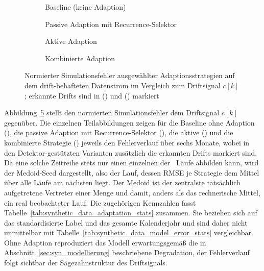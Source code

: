 %
\begin{figure}[tbp]
    \centering
    \begin{subfigure}[t]{\textwidth}
        \centering
        
        \caption{Baseline (keine Adaption)}
        \label{fig:synthetic_data_adaptation_baseline}
    \end{subfigure}

    \begin{subfigure}[t]{\textwidth}
        \centering
        
        \caption{Passive Adaption mit Recurrence-Selektor}
        \label{fig:synthetic_data_adaptation_blind_rec}
    \end{subfigure}

    \begin{subfigure}[t]{\textwidth}
        \centering
        
        \caption{Aktive Adaption}
        \label{fig:synthetic_data_adaptation_informed}
    \end{subfigure}

    \begin{subfigure}[t]{\textwidth}
        \centering
        
        \caption{Kombinierte Adaption}
        \label{fig:synthetic_data_adaptation_combined}
    \end{subfigure}
    \caption{Normierter Simulationsfehler ausgewählter Adaptionsstrategien auf dem drift-behafteten Datenstrom im Vergleich zum Driftsignal $c[k]$; erkannte Drifts sind in () und () markiert}
    \label{fig:synthetic_data_adaptation_comparison}
\end{figure}
%
Abbildung~\ref{fig:synthetic_data_adaptation_comparison} stellt den normierten Simulationsfehler dem Driftsignal $c[k]$ gegenüber. Die einzelnen Teilabbildungen zeigen für die Baseline ohne Adaption (), die passive Adaption mit Recurrence-Selektor (), die aktive () und die kombinierte Strategie () jeweils den Fehlerverlauf über sechs Monate, wobei in den Detektor-gestützten Varianten zusätzlich die erkannten Drifts markiert sind. Da eine solche Zeitreihe stets nur einen einzelnen der \adaptNSeeds\ Läufe abbilden kann, wird der Medoid-Seed dargestellt, also der Lauf, dessen \ac{RMSE} je Strategie dem Mittel über alle Läufe am nächsten liegt. Der Medoid ist der zentralste tatsächlich aufgetretene Vertreter einer Menge und damit, anders als das rechnerische Mittel, ein real beobachteter Lauf. Die zugehörigen Kennzahlen fasst Tabelle~\ref{tab:synthetic_data_adaptation_stats} zusammen. Sie beziehen sich auf das standardisierte Label und das gesamte Kalenderjahr und sind daher nicht unmittelbar mit Tabelle~\ref{tab:synthetic_data_model_error_stats} vergleichbar. Ohne Adaption reproduziert das Modell erwartungsgemäß die in Abschnitt~\ref{sec:syn_modellierung} beschriebene Degradation, der Fehlerverlauf folgt sichtbar der Sägezahnstruktur des Driftsignals. \par
